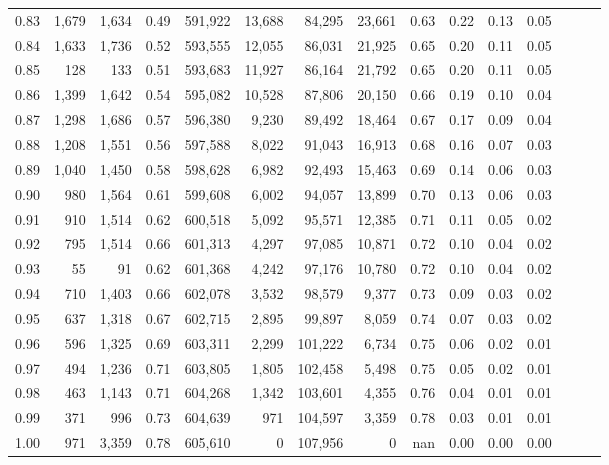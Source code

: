 \begin{tabular}{rrrrrrrrrrrrrrr}
0.83 &   1,679 &  1,634 &  0.49 &  591,922 &   13,688 &   84,295 &   23,661 &  0.63 &  0.22 &  0.13 &      0.05 \\
0.84 &   1,633 &  1,736 &  0.52 &  593,555 &   12,055 &   86,031 &   21,925 &  0.65 &  0.20 &  0.11 &      0.05 \\
0.85 &     128 &    133 &  0.51 &  593,683 &   11,927 &   86,164 &   21,792 &  0.65 &  0.20 &  0.11 &      0.05 \\
0.86 &   1,399 &  1,642 &  0.54 &  595,082 &   10,528 &   87,806 &   20,150 &  0.66 &  0.19 &  0.10 &      0.04 \\
0.87 &   1,298 &  1,686 &  0.57 &  596,380 &    9,230 &   89,492 &   18,464 &  0.67 &  0.17 &  0.09 &      0.04 \\
0.88 &   1,208 &  1,551 &  0.56 &  597,588 &    8,022 &   91,043 &   16,913 &  0.68 &  0.16 &  0.07 &      0.03 \\
0.89 &   1,040 &  1,450 &  0.58 &  598,628 &    6,982 &   92,493 &   15,463 &  0.69 &  0.14 &  0.06 &      0.03 \\
0.90 &     980 &  1,564 &  0.61 &  599,608 &    6,002 &   94,057 &   13,899 &  0.70 &  0.13 &  0.06 &      0.03 \\
0.91 &     910 &  1,514 &  0.62 &  600,518 &    5,092 &   95,571 &   12,385 &  0.71 &  0.11 &  0.05 &      0.02 \\
0.92 &     795 &  1,514 &  0.66 &  601,313 &    4,297 &   97,085 &   10,871 &  0.72 &  0.10 &  0.04 &      0.02 \\
0.93 &      55 &     91 &  0.62 &  601,368 &    4,242 &   97,176 &   10,780 &  0.72 &  0.10 &  0.04 &      0.02 \\
0.94 &     710 &  1,403 &  0.66 &  602,078 &    3,532 &   98,579 &    9,377 &  0.73 &  0.09 &  0.03 &      0.02 \\
0.95 &     637 &  1,318 &  0.67 &  602,715 &    2,895 &   99,897 &    8,059 &  0.74 &  0.07 &  0.03 &      0.02 \\
0.96 &     596 &  1,325 &  0.69 &  603,311 &    2,299 &  101,222 &    6,734 &  0.75 &  0.06 &  0.02 &      0.01 \\
0.97 &     494 &  1,236 &  0.71 &  603,805 &    1,805 &  102,458 &    5,498 &  0.75 &  0.05 &  0.02 &      0.01 \\
0.98 &     463 &  1,143 &  0.71 &  604,268 &    1,342 &  103,601 &    4,355 &  0.76 &  0.04 &  0.01 &      0.01 \\
0.99 &     371 &    996 &  0.73 &  604,639 &      971 &  104,597 &    3,359 &  0.78 &  0.03 &  0.01 &      0.01 \\
1.00 &     971 &  3,359 &  0.78 &  605,610 &        0 &  107,956 &        0 &   nan &  0.00 &  0.00 &      0.00 \\
\bottomrule
\end{tabular}
